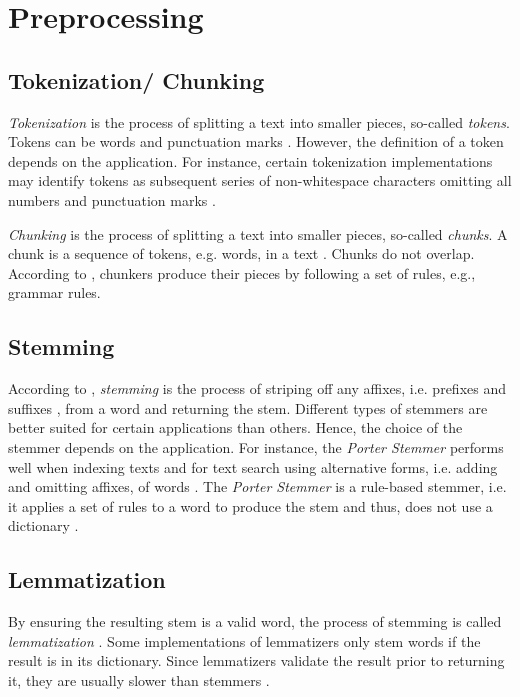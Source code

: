 \section{Preprocessing}\label{sec:preprocessing}


\subsection{Tokenization/ Chunking}\label{subsec:tokenization}

\textit{Tokenization} is the process of splitting a text into smaller pieces, so-called \textit{tokens}.
Tokens can be words and punctuation marks \cite{nlp-book2009}.
However, the definition of a token depends on the application.
For instance, certain tokenization implementations may identify tokens as subsequent series of non-whitespace characters omitting all numbers and punctuation marks \cite{IR2011}.

\textit{Chunking} is the process of splitting a text into smaller pieces, so-called \textit{chunks}.
A chunk is a sequence of tokens, e.g. words, in a text \cite{nlp-book2009}.
Chunks do not overlap.
According to \citeauthor{nlp-book2009}, chunkers produce their pieces by following a set of rules, e.g., grammar rules.

\subsection{Stemming}\label{subsec:stemming}

According to \citeauthor{nlp-book2009}, \textit{stemming} is the process of striping off any affixes, i.e. prefixes and suffixes \cite{IR2011}, from a word and returning the stem.
Different types of stemmers are better suited for certain applications than others.
Hence, the choice of the stemmer depends on the application.
For instance, the \textit{Porter Stemmer} performs well when indexing texts and for text search using alternative forms, 
i.e. adding and omitting affixes, of words \cite{nlp-book2009}.
The \textit{Porter Stemmer} is a rule-based stemmer, i.e. it applies a set of rules to a word to produce the stem and thus, does not use a dictionary \cite{IR2011}.

\subsection{Lemmatization}\label{subsec:lemmatization}

By ensuring the resulting stem is a valid word, the process of stemming is called \textit{lemmatization} \cite{nlp-book2009}.
Some implementations of lemmatizers only stem words if the result is in its dictionary.
Since lemmatizers validate the result prior to returning it, they are usually slower than stemmers \cite{nlp-book2009}.


